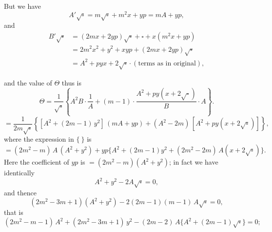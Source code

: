 \documentclass[11pt,a4paper]{article}
\theoremstyle{plain}
\begin{document}
\medskip

But we have
\[
A'\sqrt{\square} = m\sqrt{\square} + m^2 x + y p = m A + y p,
\]
and
\begin{align*}
B'\sqrt{\square} &= (2 m x + 2 y p)\sqrt{\square} + \square + x(m^2 x + y p) \\
                 &= 2 m^2 x^2 + y^2 + x y p + (2 m x + 2 y p)\sqrt{\square} \\
                 &= A^2 + p y x + 2\sqrt{\square}\cdot(\text{terms as in original}),
\end{align*}

\noindent and the value of $\Theta$ thus is
\[
\Theta = \frac{1}{\sqrt{\square}}\!\left\{A^2 B \cdot\frac{1}{A} + (m - 1)\cdot\frac{A^2 + p y(x + 2\sqrt{\square})}{B}\cdot A\right\}.
\]
\[
= \frac{1}{2 m\sqrt{\square}}\!\left\{[A^2 + (2 m - 1)\,y^2]\,(m A + y p) + (A^2 - 2 m)\,[A^2 + p y(x + 2\sqrt{\square})]\right\},
\]
where the expression in $\{\ \}$ is
\[
= (2 m^2 - m)\,A\,(A^2 + y^2) + y p\{A^2 + (2 m - 1)y^2 + (2 m^2 - 2 m)\,A(x + 2\sqrt{\square})\}.
\]
Here the coefficient of $y p$ is $= (2 m^2 - m)(A^2 + y^2)$; in fact we have identically
\[
A^2 + y^2 - 2 A\sqrt{\square} = 0,
\]
and thence
\[
(2 m^2 - 3 m + 1)(A^2 + y^2) - 2(2 m - 1)(m - 1)\,A\sqrt{\square} = 0,
\]
that is
\[
(2 m^2 - m - 1)\,A^2 + (2 m^2 - 3 m + 1)\,y^2 - (2 m - 2)\,A\{A^2 + (2 m - 1)\sqrt{\square}\} = 0;
\]

\medskip
{}
\end{document}
